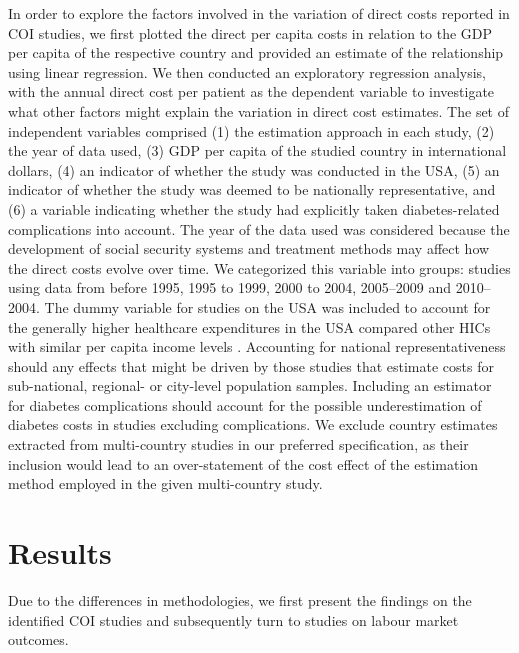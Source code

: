 In order to explore the factors involved in the variation of direct costs reported in \ac{COI} studies, we first plotted the direct per capita costs in relation to the \ac{GDP} per capita of the respective country and provided an estimate of the relationship using linear regression. We then conducted an exploratory regression analysis, with the annual direct cost per patient as the dependent variable to investigate what other factors might explain the variation in direct cost estimates. The set of independent variables comprised (1) the estimation approach in each study, (2) the year of data used, (3) \ac{GDP} per capita of the studied country in international dollars, (4) an indicator of whether the study was conducted in the USA, (5) an indicator of whether the study was deemed to be nationally representative, and (6) a variable indicating whether the study had explicitly taken diabetes-related complications into account. The year of the data used was considered because the development of social security systems and treatment methods may affect how the direct costs evolve over time. We categorized this variable into groups: studies using data from before 1995, 1995 to 1999, 2000 to 2004, 2005--2009 and 2010--2004.  The dummy variable for studies on the USA was included to account for the generally higher healthcare expenditures in the USA compared \DIFdelbegin {}\DIFdelend \DIFaddbegin {}\DIFaddend other \acp{HIC} with similar per capita income levels \parencite{Laugesen2011}. Accounting for national representativeness should \DIFdelbegin {}\DIFdelend \DIFaddbegin {}\DIFaddend any effects that might be driven by those studies that estimate costs for sub-national, regional- or city-level population samples. Including an estimator for diabetes complications should account for the possible underestimation of diabetes costs in studies excluding complications. We exclude country estimates extracted from multi-country studies in our preferred specification, as their inclusion would lead to an over-statement of the cost effect of the estimation method employed in the given multi-country study. 

\section{Results}
Due to the differences in methodologies, we first present the findings on the identified \ac{COI} studies and subsequently turn to studies on labour market outcomes.

